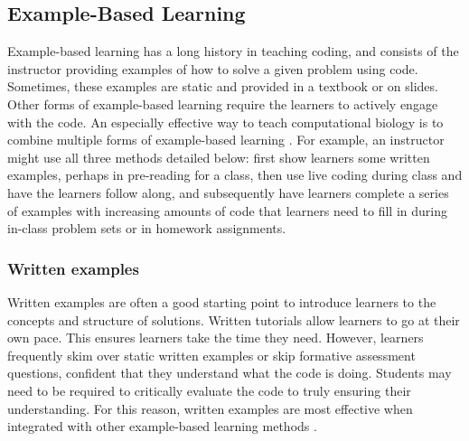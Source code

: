 \subsection{Example-Based Learning}

Example-based learning has a long history in teaching coding, and consists of the instructor providing examples of how to solve a given problem using code.
Sometimes, these examples are static and provided in a textbook or on slides. 
Other forms of example-based learning require the learners to actively engage with the code. 
An especially effective way to teach computational biology is to combine multiple forms of example-based learning \citep{renkl_learning_2014}.
For example, an instructor might use all three methods detailed below:
first show learners some written examples, perhaps in pre-reading for a class, then use live coding during class and have the learners follow along, and subsequently have learners complete a series of examples with increasing amounts of code that learners need to fill in during in-class problem sets or in homework assignments.



\subsubsection{Written examples}

Written examples are often a good starting point to introduce learners to the concepts and structure of solutions.
Written tutorials allow learners to go at their own pace.
This ensures learners take the time they need.
However, learners frequently skim over static written examples or skip formative assessment questions, 
confident that they understand what the code is doing.
Students may need to be required to critically evaluate the code to truly ensuring their understanding.
For this reason, written examples are most effective when integrated with other example-based learning methods \citep{renkl_learning_2014}.


